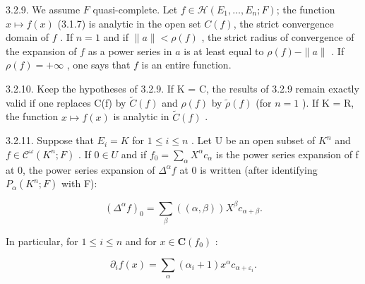 3.2.9. We assume \(F\) quasi-complete. Let \(f \in \mathcal{H}(E_1, \ldots, E_n; F)\); the function \(x \mapsto f(x)\) (3.1.7) is analytic in the open set \(C(f)\), the strict convergence domain of \(f\) . If \(n = 1\) and if \(\|a\| < \rho(f)\) , the strict radius of convergence of the expansion of \(f\) as a power series in \(a\) is at least equal to \(\rho(f) - \|a\|\) . If \(\rho(f) = +\infty\) , one says that \(f\) is an entire function.

3.2.10. Keep the hypotheses of 3.2.9. If K = C, the results of 3.2.9 remain exactly valid if one replaces C(f) by \(\tilde{C}(f)\) and \(\rho(f)\) by \(\tilde{\rho}(f)\) (for \(n = 1\) ). If K = R, the function \(x \mapsto f(x)\) is analytic in \(\tilde{C}(f)\) .

3.2.11. Suppose that \(E_{i} = K\) for \(1 \leqslant i \leqslant n\) . Let U be an open subset of \(K^{n}\) and \(f \in \mathcal{C}^{\omega}(K^{n}; F)\) . If \(0 \in U\) and if \(f_{0} = \sum_{\alpha} X^{\alpha} c_{\alpha}\) is the power series expansion of f at 0, the power series expansion of \(\Delta^{\alpha} f\) at 0 is written (after identifying \(P_{\alpha}(K^{n}; F)\) with F):

\[
(\Delta^ {\alpha} f) _ {0} = \sum_ {\beta} ((\alpha , \beta)) X ^ {\beta} c _ {\alpha + \beta}.
\]

In particular, for \(1 \leqslant i \leqslant n\) and for \(x \in \mathbf{C}(f_0)\) :

\[
\partial_ {i} f (x) = \sum_ {\alpha} (\alpha_ {i} + 1) x ^ {\alpha} c _ {\alpha + \varepsilon_ {i}}.
\]

